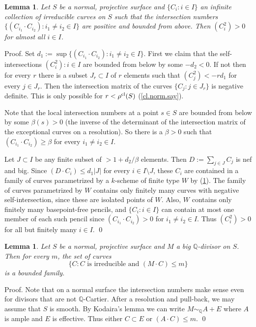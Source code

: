 \documentclass{amsart}
\newtheorem{lem}[thm]{Lemma}
\theoremstyle{definition}
\theoremstyle{remark}
\newcommand{\q}[0]{{\mathbb Q}}
\newcommand{\simq}[0]{\sim_{\q}}
\newcommand{\tsum}[0]{\textstyle{\sum}}
\begin{document}
\begin{lem} \label{inf.cur.on.surf.lem}
Let $S$ be a normal, projective surface and  $\{C_i: i\in I\}$ an infinite collection of irreducible curves on $S$ such that the 
intersection numbers $\{(C_{i_1}\cdot C_{i_2}): i_1\neq i_2\in I\}$ are positive and bounded from above. Then $(C_i^2)>0$ for almost all $i\in I$.
\end{lem}




Proof.  Set $d_1:=\sup \{(C_{i_1}\cdot C_{i_2}): i_1\neq i_2\in I\}$. 
First we claim that the  self-intersections $(C_i^2):i\in I$ are bounded from below  by some $-d_2<0$. If not then for every $r$ there is a subset  $J_r\subset I$ of $r$ elements such that $(C_j^2)<-rd_1$ for every $j\in J_r$.  Then the
intersection matrix of the curves  $\{C_j:j\in J_r\}$ is negative definite. This is only possible for  $r<\rho^{\rm cl}(S)$  (\ref{cl.norm.say}). 


Note that the local intersection numbers at a point $s\in S$ are bounded from below by some $\beta(s)>0$  (the inverse of the determinant of the intersection matrix of the exceptional curves on  a resolution). 
So there is a $\beta>0$ such that  
$(C_{i_1}\cdot C_{i_2})\geq \beta$ for every $ i_1\neq i_2\in I$.



Let $J\subset I$ be any finite subset of $>1+d_2/\beta$ elements.
Then  $D:=\tsum_{j\in J} C_j$ is nef and big. Since
$(D\cdot C_i)\leq d_1|J|$ for every $i\in I\setminus J$,  these $C_i$ are contained in a  family of curves parametrized by a $k$-scheme of finite type $W$ by (\ref{nef.big.bdd.lem}). The  family of curves parametrized by $W$ contains only finitely many
curves with negative self-intersection,  since these are isolated points of  $W$. Also, $W$ contains only 
 finitely many basepoint-free pencils, and  $\{C_i: i\in I\}$ can contain at most one member of each such pencil since $(C_{i_1}\cdot C_{i_2})>0$ for $ i_1\neq i_2\in I$. Thus $(C_i^2)>0$ for all but finitely many  $i\in I$.
 \qed

\begin{lem} \label{nef.big.bdd.lem}
Let $S$ be a normal, projective surface and $M$ a   big $\q$-divisor on $S$. Then for every $m$, the set of curves
$$
\{C\colon   C \mbox{ is irreducible and } (M\cdot C)\leq m\}
$$
is a bounded family.
\end{lem}

Proof. Note that on a normal surface the intersection numbers  make sense even for divisors that are not $\q$-Cartier.  After a resolution and pull-back, we may assume that $S$ is smooth.
By Kodaira's lemma  \cite[2.60]{km-book}  we can write  $M\simq A+E$ where $A$ is ample and $E$ is effective.  Thus either $C\subset E$ or $(A\cdot C)\leq m$. \qed
\medskip
\end{document}
